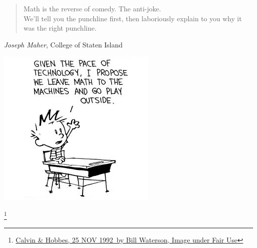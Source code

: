 \documentclass[aspectratio=169]{beamer}
\newcommand\blfootnote[1]{%
  \begingroup
  \renewcommand\thefootnote{}\footnote{#1}%
  \addtocounter{footnote}{-1}%
  \endgroup
}
\begin{document}

\begin{frame}
\begin{quote}
                 Math is the reverse of comedy. The anti-joke.\\
    We'll tell you the punchline first, then
    laboriously explain to you
    why it was the right punchline.
\end{quote}
\begin{center}
\textit{Joseph Maher}, College of Staten Island 
\end{center}

\end{frame}


\begin{frame}
\begin{center}
\includegraphics[scale=0.7]{images/go_play_outside.jpg} 
\end{center}
\blfootnote{\href{http://www.gocomics.com/calvinandhobbes/1992/11/25}{\glqq Calvin \& Hobbes, 25 NOV 1992\grqq\ by Bill Waterson, Image under Fair Use}}
\end{frame}

\end{document}
